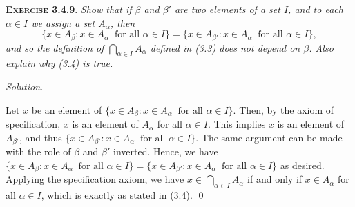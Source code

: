 \documentclass[12pt]{article}
\theoremstyle{remark}
\newenvironment{exer}[2]{
    \noindent \setlength{\parskip}{1em}%
    \textsc{\textbf{Exercise #1}}. \textit{#2} \par
    \noindent \textit{Solution.} %
}{\bigskip}
\begin{document}
\begin{exer}{3.4.9}{Show that if $\beta$ and $\beta'$ are two elements of a set $I$, and to each $\alpha \in I$ we assign a set $A_\alpha$, then
    \[
        \{x \in A_\beta : x \in A_\alpha\ \text{ for all } \alpha \in I \}
        = \{x \in A_{\beta'} : x \in A_\alpha\ \text{ for all } \alpha \in I \},
    \]
    and so the definition of $\bigcap_{\alpha \in I} A_\alpha$ defined in (3.3) does not depend on $\beta$.
    Also explain why (3.4) is true.
}
    Let $x$ be an element of $\{x \in A_\beta : x \in A_\alpha\ \text{ for all } \alpha \in I \}$.
    Then, by the axiom of specification, $x$ is an element of $A_\alpha$ for all $\alpha \in I$.
    This implies $x$ is an element of $A_{\beta'}$, and thus $\{x \in A_{\beta'} : x \in A_\alpha\ \text{ for all } \alpha \in I \}$.
    The same argument can be made with the role of $\beta$ and $\beta'$ inverted.
    Hence, we have $\{x \in A_\beta : x \in A_\alpha\ \text{ for all } \alpha \in I \} = \{x \in A_{\beta'} : x \in A_\alpha\ \text{ for all } \alpha \in I \}$ as desired.
    Applying the specification axiom, we have $x \in \bigcap_{\alpha \in I} A_\alpha$ if and only if $x \in A_\alpha$ for all $\alpha \in I$, which is exactly as stated in (3.4).
    \qed
\end{exer}
\end{document}
